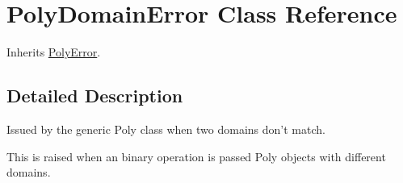 \hypertarget{classpyneb_1_1utils_1_1polyutils_1_1_poly_domain_error}{\section{Poly\-Domain\-Error Class Reference}
\label{classpyneb_1_1utils_1_1polyutils_1_1_poly_domain_error}
}


Inherits \hyperlink{classpyneb_1_1utils_1_1polyutils_1_1_poly_error}{Poly\-Error}.



\subsection{Detailed Description}
\begin{DoxyVerb}Issued by the generic Poly class when two domains don't match.

This is raised when an binary operation is passed Poly objects with
different domains.\end{DoxyVerb}
 